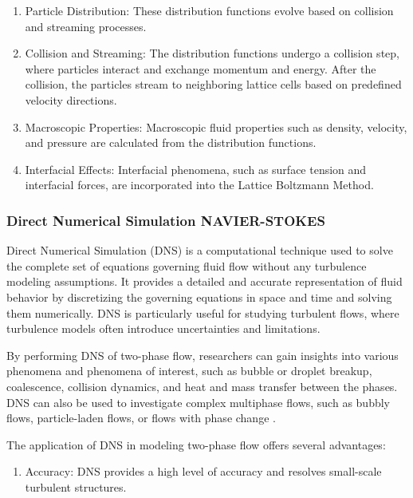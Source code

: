 {\begin{enumerate}
			\item Particle Distribution: These distribution functions evolve based on collision and streaming processes.
			
			\item Collision and Streaming: The distribution functions undergo a collision step, where particles interact and exchange momentum and energy. After the collision, the particles stream to neighboring lattice cells based on predefined velocity directions.
			
			\item Macroscopic Properties: Macroscopic fluid properties such as density, velocity, and pressure are calculated from the distribution functions.
			
			\item Interfacial Effects: Interfacial phenomena, such as surface tension and interfacial forces, are incorporated into the Lattice Boltzmann Method.
			
		\end{enumerate}
		
	\subsubsection{Direct Numerical Simulation NAVIER-STOKES}
	
		Direct Numerical Simulation (DNS) is a computational technique used to solve the complete set of equations governing fluid flow without any turbulence modeling assumptions. It provides a detailed and accurate representation of fluid behavior by discretizing the governing equations in space and time and solving them numerically. DNS is particularly useful for studying turbulent flows, where turbulence models often introduce uncertainties and limitations.

		By performing DNS of two-phase flow, researchers can gain insights into various phenomena and phenomena of interest, such as bubble or droplet breakup, coalescence, collision dynamics, and heat and mass transfer between the phases. DNS can also be used to investigate complex multiphase flows, such as bubbly flows, particle-laden flows, or flows with phase change \cite{chen1998lattice}.
		
		The application of DNS in modeling two-phase flow offers several advantages:
		
		\begin{enumerate}
			\item Accuracy: DNS provides a high level of accuracy and resolves small-scale turbulent structures.
			

\end{enumerate}}
